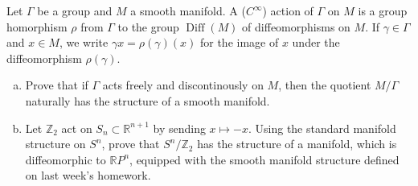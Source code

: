 \documentclass{article}
\newenvironment{problem}[2][Problem]{\begin{trivlist}
\item[\hskip \labelsep {\bfseries #1}\hskip \labelsep {\bfseries #2.}]}{\end{trivlist}}
\begin{document}
\pagebreak

\begin{problem}{5}
  Let $\Gamma$ be a group and $M$ a smooth manifold. A ($C^\infty$) action of
  $\Gamma$ on $M$ is a group homorphism $\rho$ from $\Gamma$ to the group
  $\operatorname{Diff}(M)$ of diffeomorphisms on $M$. If $\gamma \in \Gamma$ and $x \in M$,
  we write $\gamma x = \rho(\gamma)(x)$ for the image of $x$ under the
  diffeomorphism $\rho(\gamma)$.
  \begin{enumerate}[(a)]
    \item Prove that if $\Gamma$ acts freely and discontinously on $M$, then the
    quotient $M/\Gamma$ naturally has the structure of a smooth manifold.
    \item Let $\mathbb{Z}_2$ act on $S_n \subset \mathbb{R}^{n+1}$ by sending
    $x \mapsto -x$. Using the standard manifold structure on $S^n$, prove that
    $S^n/\mathbb{Z}_2$ has the structure of a manifold, which is diffeomorphic
    to $\mathbb{R}P^n$, equipped with the smooth manifold structure defined on
    last week's homework.
  \end{enumerate}
\end{problem}
\end{document}
